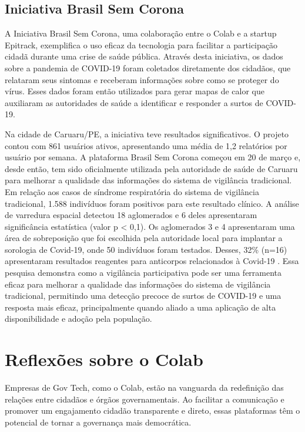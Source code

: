 \subsection*{Iniciativa Brasil Sem Corona}

A Iniciativa Brasil Sem Corona, uma colaboração entre o Colab e a startup Epitrack, exemplifica o uso eficaz da tecnologia para facilitar a participação cidadã durante uma crise de saúde pública. Através desta iniciativa, os dados sobre a pandemia de COVID-19 foram coletados diretamente dos cidadãos, que relataram seus sintomas e receberam informações sobre como se proteger do vírus. Esses dados foram então utilizados para gerar mapas de calor que auxiliaram as autoridades de saúde a identificar e responder a surtos de COVID-19.

Na cidade de Caruaru/PE, a iniciativa teve resultados significativos. O projeto contou com 861 usuários ativos, apresentando uma média de 1,2 relatórios por usuário por semana. A plataforma Brasil Sem Corona começou em 20 de março e, desde então, tem sido oficialmente utilizada pela autoridade de saúde de Caruaru para melhorar a qualidade das informações do sistema de vigilância tradicional. Em relação aos casos de síndrome respiratória do sistema de vigilância tradicional, 1.588 indivíduos foram positivos para este resultado clínico. A análise de varredura espacial detectou 18 aglomerados e 6 deles apresentaram significância estatística (valor p < 0,1). Os aglomerados 3 e 4 apresentaram uma área de sobreposição que foi escolhida pela autoridade local para implantar a sorologia de Covid-19, onde 50 indivíduos foram testados. Desses, 32\% (n=16) apresentaram resultados reagentes para anticorpos relacionados à Covid-19 \cite[1]{2020_LealNeto}. Essa pesquisa demonstra como a vigilância participativa pode ser uma ferramenta eficaz para melhorar a qualidade das informações do sistema de vigilância tradicional, permitindo uma detecção precoce de surtos de COVID-19 e uma resposta mais eficaz, principalmente quando aliado a uma aplicação de alta disponibilidade e adoção pela população.

\section{Reflexões sobre o Colab}

Empresas de Gov Tech, como o Colab, estão na vanguarda da redefinição das relações entre cidadãos e órgãos governamentais. Ao facilitar a comunicação e promover um engajamento cidadão transparente e direto, essas plataformas têm o potencial de tornar a governança mais democrática.

